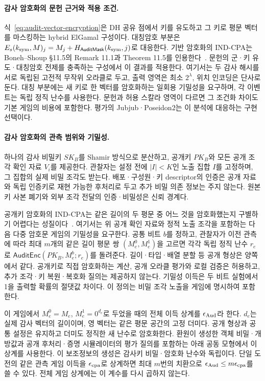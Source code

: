 \paragraph{감사 암호화의 문헌 근거와 적용 조건.}
식~\eqref{eq:audit-vector-encryption}은 DH 공유 점에서 키를 유도하고
그 키로 평문 벡터를 마스킹하는 hybrid ElGamal 구성이다.
대칭암호 부분은 $E_s(k_{\rm sym},M)_j=M_j+
H_{\mathsf{AuditMask}}(k_{\rm sym},j)$로 대응한다.
기반 암호화의 IND-CPA는 Boneh--Shoup \S11.5의
Remark 11.1과 Theorem 11.5를 인용한다~\cite{boneh-shoup-2020}.
문헌의 군·키 유도·대칭암호 전제를 충족하는 구성에서 이 결과를 적용한다.
여기서는 두 감사 해시를 서로 독립된 고전적 무작위 오라클로 두고,
출력 영역은 최소 $2^\lambda$, 위치 인코딩은 단사로 둔다.
대칭 부분에는 새 키로 한 벡터를 암호화하는 일회용 기밀성을 요구하며,
각 이벤트는 독립 정직 난수를 사용한다.
문헌과 허용 스칼라 영역이 다르면 그 조건화 차이도 기본 게임의 비용에
포함한다. 평가의 Jubjub·Poseidon2는 이 분석에 대응하는 구현 선택이다.

\paragraph{감사 암호화의 관측 범위와 기밀성.}
하나의 감사 비밀키 $SK_B$를 Shamir 방식으로 분산하고,
공개키 $PK_B$와 모든 공개 조각 확인 자료 $V_i$를 제공한다.
관찰자는 설정 전에 $|I|<K$인 노출 집합 $I$를 고정하며,
그 집합의 실제 비밀 조각도 받는다. 배포·구성원·키 descriptor의
인증은 공개 자료와 독립 인증키로 재현 가능한 후처리로 두고
추가 비밀 의존 정보는 주지 않는다.
원본 키 사본 폐기와 외부 조각 전달의 인증·비밀성은 신뢰 경계다.

공개키 암호화의 IND-CPA는 같은 길이의 두 평문 중 어느 것을
암호화했는지 구별하기 어렵다는 성질이다~\cite{boneh-shoup-2020}.
여기서는 위 공개 확인 자료와 정적 노출 조각을 포함하는 다음
다중 암호문 게임의 기밀성을 요구한다.
공통 비트 $b$를 정하고, 관찰자가 이전 관측에 따라 최대 $m$개의
같은 길이 평문 쌍 $(M_e^0,M_e^1)$을 고르면
각각 독립 정직 난수 $r_e$로
$\mathsf{AuditEnc}(PK_B,M_e^b;r_e)$를 돌려준다.
길이·타입·배열 분할 등 공개 형상은 양쪽에서 같다.
공개키로 직접 암호화하는 계산, 공개 오라클 평가와 로컬 검증은
허용하고, 추가 조각·키 복원·복호화 질의는 제공하지 않는다.
기밀성 이득은 두 비트 실험에서 1을 출력할 확률의 절댓값 차이다.
이 정의는 비밀 조각 노출을 게임에 명시하여 포함한다.

이 게임에서 $M_e^0=M_e$, $M_e^1=0^{d_e}$로 두었을 때의
전체 이득 상계를 $\epsilon_{\rm Aud}$라 한다.
$d_e$는 실제 감사 벡터의 길이이며, 영 벡터는 같은 평문 공간의
고정 더미다. 공개 형상과 공통 설정은 유지하고 더미도 정직한
새 난수로 암호화한다. 환원이 생성한 객체 비밀·개방값과 공개
후처리·증명 시뮬레이터의 평가 질의를 포함하는 아래 공동 모형에서
이 상계를 사용한다. 이 보조정보의 생성은 감사키 비밀·암호화 난수와 독립이다.
단일 도전의 같은 관측 게임 이득을 $\epsilon_{\rm cpa}$로
상계하면 최대 $m$번의 치환으로 $\epsilon_{\rm Aud}\leq
m\epsilon_{\rm cpa}$를 쓸 수 있다. 전체 게임 상계에는 이 계수를
다시 곱하지 않는다.

